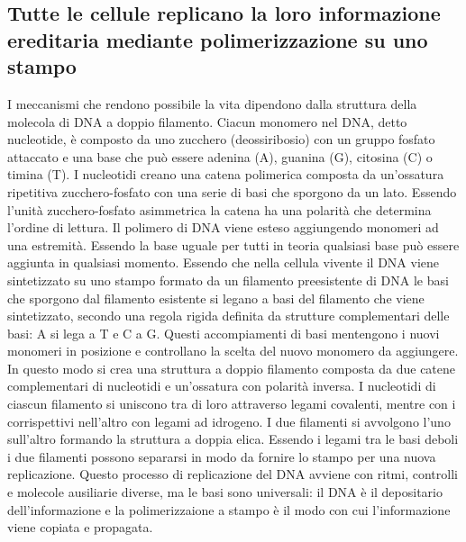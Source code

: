 \subsection{Tutte le cellule replicano la loro informazione ereditaria mediante polimerizzazione su uno stampo}
I meccanismi che rendono possibile la vita dipendono dalla struttura della molecola di DNA a doppio filamento. Ciacun monomero nel DNA, detto nucleotide, 
\`e composto da uno zucchero (deossiribosio) con un gruppo fosfato attaccato e una base che pu\`o essere adenina (A), guanina (G), citosina (C) o timina 
(T). I nucleotidi creano una catena polimerica composta da un'ossatura ripetitiva zucchero-fosfato con una serie di basi che sporgono da un lato. Essendo 
l'unit\`a zucchero-fosfato asimmetrica la catena ha una polarit\`a che determina l'ordine di lettura. Il polimero di DNA viene esteso aggiungendo monomeri 
ad una estremit\`a. Essendo la base uguale per tutti in teoria qualsiasi base pu\`o essere aggiunta in qualsiasi momento. Essendo che nella cellula vivente 
il DNA viene sintetizzato su uno stampo formato da un filamento preesistente di DNA le basi che sporgono dal filamento esistente si legano a basi del 
filamento che viene sintetizzato, secondo una regola rigida definita da strutture complementari delle basi: A si lega a T e C a G. Questi accompiamenti di 
basi mentengono i nuovi monomeri in posizione e controllano la scelta del nuovo monomero da aggiungere. In questo modo si crea una struttura a doppio 
filamento composta da due catene complementari di nucleotidi e un'ossatura con polarit\`a inversa. I nucleotidi di ciascun filamento si uniscono tra di loro 
attraverso legami covalenti, mentre con i corrispettivi nell'altro con legami ad idrogeno. I due filamenti si avvolgono l'uno sull'altro formando la 
struttura a doppia elica. Essendo i legami tra le basi deboli i due filamenti possono separarsi in modo da fornire lo stampo per una nuova replicazione. 
Questo processo di replicazione del DNA avviene con ritmi, controlli e molecole ausiliarie diverse, ma le basi sono universali: il DNA \`e il depositario 
dell'informazione e la polimerizzaione a stampo \`e il modo con cui l'informazione viene copiata e propagata. 
